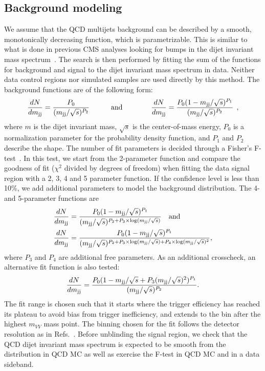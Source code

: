 \subsection{Background modeling}
\label{sec:searchI:bkg}
We assume that the QCD multijets background can be described by a smooth, monotonically decreasing function, which is parametrizable. This is similar to what is done in previous CMS analyses looking for bumps in the dijet invariant mass spectrum~\cite{Chatrchyan:2012ypy,CMS-PAS-EXO-12-059}. The search is then performed by fitting the sum of the functions for background and signal to the dijet invariant mass spectrum in data. Neither data control regions nor simulated samples are used directly by this method. The background functions are of the following form:
\begin{equation}
\label{eq:dijet1}
\frac{dN}{dm_\mathrm{jj}}= \frac{ P_0 } { (m_\mathrm{jj}/\sqrt{s})^{P_2} }\quad\quad\quad{\rm and}
\quad\quad\quad\quad
\frac{dN}{dm_\mathrm{jj}}= \frac{ P_0(1-m_\mathrm{jj}/\sqrt{s})^{P_1} } { (m_\mathrm{jj}/\sqrt{s})^{P_2} }\:\:,
\end{equation}
where $m$ is the dijet invariant mass, $\sqrt{s}$ is the center-of-mass energy, $P_0$ is a normalization parameter for the probability density function, and $P_1$ and $ P_2$ describe the shape. The number of fit parameters is decided through a Fisher's F-test~\cite{RePEc:bla:istatr:v:80:y:2012:i:3:p:491-491}. In this test, we start from the 2-parameter function and compare the goodness of fit ($\chi^2$ divided by degrees of freedom) when fitting the data signal region with a 2, 3, 4 and 5 parameter function. If the confidence level is less than 10\%, we add additional parameters to model the background distribution. The 4- and 5-parameter functions are
\begin{align}
\label{eq:dijet2}
\frac{dN}{d m_\mathrm{jj}} &= \frac{ P_0(1-m_\mathrm{jj}/\sqrt{s})^{P_1} } {(m_\mathrm{jj}/\sqrt{s})^{P_2+P_3\times\log(m_\mathrm{jj}/\sqrt{s})} }\quad{\rm and}\\
\frac{dN}{d m_\mathrm{jj}} &= \frac{ P_0(1-m_\mathrm{jj}/\sqrt{s})^{P_1} } {(m_\mathrm{jj}/\sqrt{s})^{P_2+P_3\times\log(m_\mathrm{jj}/\sqrt{s})+P_4\times\log(m_\mathrm{jj}/\sqrt{s})^2} },
\end{align}
where $P_3$ and $P_4$ are additional free parameters. As an additional crosscheck, an alternative fit function is also tested:
\begin{equation}
\label{eq:dijet4}
\frac{dN}{dm_\mathrm{jj}} = \frac{ P_0(1-m_\mathrm{jj} / \sqrt{s}+P_3(m_\mathrm{jj} / \sqrt{s})^2)^{P_1} } { (m_\mathrm{jj}/\sqrt{s})^{P_2} }.
\end{equation}
The fit range is chosen such that it starts where the trigger efficiency has reached its plateau to avoid bias from trigger inefficiency, and extends to the bin after the highest $m_{VV}$ mass point. The binning chosen for the fit follows the detector resolution as in Refs.~\cite{Chatrchyan:2012ypy,CMS-PAS-EXO-12-059}. Before unblinding the signal region, we check that the QCD dijet invariant mass spectrum is expected to be smooth from the distribution in QCD MC as well as exercise the F-test in QCD MC and in a data sideband.\par
